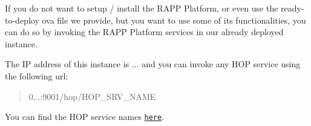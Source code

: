 If you do not want to setup / install the R\-A\-P\-P Platform, or even use the ready-\/to-\/deploy ova file we provide, but you want to use some of its functionalities, you can do so by invoking the R\-A\-P\-P Platform services in our already deployed instance.

The I\-P address of this instance is {...} and you can invoke any H\-O\-P service using the following url\-:

\begin{quotation}
0...\-:9001/hop/\-H\-O\-P\-\_\-\-S\-R\-V\-\_\-\-N\-A\-M\-E

\end{quotation}


You can find the H\-O\-P service names \href{https://github.com/rapp-project/rapp-platform/wiki/RAPP-HOP-services}{\tt here}. 